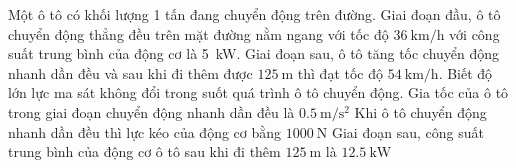 \begin{ex}
	Một ô tô có khối lượng 1 tấn đang chuyển động trên đường. Giai đoạn đầu, ô tô chuyển động thẳng đều trên mặt đường nằm ngang với tốc độ $\SI{36}{\kilo\meter/\hour}$ với công suất trung bình của động cơ là \SI{5}{\kilo\watt}. Giai đoạn sau, ô tô tăng tốc chuyển động nhanh dần đều và sau khi đi thêm được $\SI{125}{\meter}$ thì đạt tốc độ $\SI{54}{\kilo\meter/\hour}$. Biết độ lớn lực ma sát không đổi trong suốt quá trình ô tô chuyển động.
	{\True Gia tốc của ô tô trong giai đoạn chuyển động nhanh dần đều là $\SI{0.5}{\meter/\second^2}$}
	{\True Khi ô tô chuyển động nhanh dần đều thì lực kéo của động cơ bằng $\SI{1000}{\newton}$}
	{\True Giai đoạn sau, công suất trung bình của động cơ ô tô sau khi đi thêm $\SI{125}{\meter}$ là $\SI{12.5}{\kilo\watt}$}
\end{ex}
